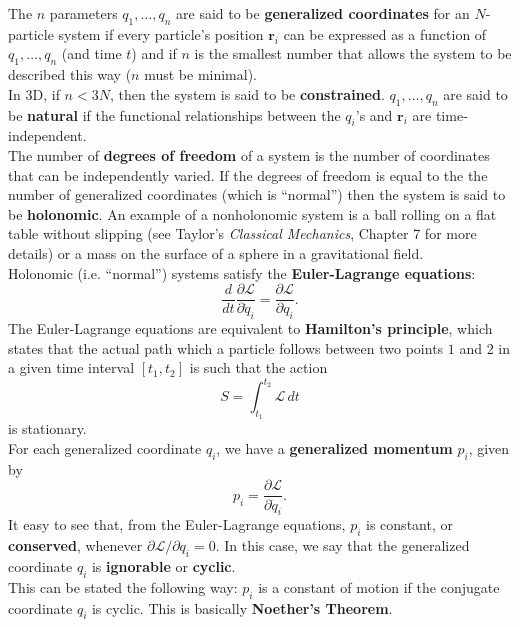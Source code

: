 \documentclass{book}
\theoremstyle{definition}
\newcommand{\p}{\partial}
\newcommand{\lag}{\mathcal{L}}
\newcommand{\f}[2]{\frac{#1}{#2}}
\begin{document}
The $n$ parameters $q_1,\dots,q_n$ are said to be \textbf{generalized coordinates} for an $N$-particle system if every particle's position $\mathbf{r}_i$ can be expressed as a function of $q_1,\dots,q_n$ (and time $t$) and if $n$  is the smallest number that allows the system to be described this way ($n$ must be minimal). \\

In 3D, if $n< 3N$, then the system is said to be \textbf{constrained}. $q_1,\dots,q_n$ are said to be \textbf{natural} if the functional relationships between the $q_i$'s and $\mathbf{r}_i$ are time-independent. \\


The number of \textbf{degrees of freedom} of a system is the number of coordinates that can be independently varied. If the degrees of freedom is equal to the the number of generalized coordinates (which is ``normal'') then the system is said to be \textbf{holonomic}. An example of a nonholonomic system is a ball rolling on a flat table without slipping (see Taylor's \textit{Classical Mechanics}, Chapter 7 for more details) or a mass on the surface of a sphere in a gravitational field. \\


Holonomic (i.e. ``normal'') systems satisfy the \textbf{Euler-Lagrange equations}:
\begin{equation*}
\f{d}{dt}\f{\p \lag}{\p \dot{q}_i} = \f{\p \lag}{\p {q}_i}.
\end{equation*} 
The Euler-Lagrange equations are equivalent to \textbf{Hamilton's principle}, which states that the actual path which a particle follows between two points $1$ and $2$ in a given time interval $[t_1,t_2]$ is such that the action 
\begin{equation*}
S = \int^{t_2}_{t_1} \lag\,dt
\end{equation*}
is stationary. \\


For each generalized coordinate $q_i$, we have a \textbf{generalized momentum} $p_i$, given by
\begin{equation*}
p_i = \f{\p \lag}{\p \dot{q}_i}.
\end{equation*}
It easy to see that, from the Euler-Lagrange equations, $p_i$ is constant, or \textbf{conserved}, whenever $\p\lag / \p q_i = 0$. In this case, we say that the generalized coordinate $q_i$ is \textbf{ignorable} or \textbf{cyclic}.  \\

This can be stated the following way: $p_i$ is a constant of motion if the conjugate coordinate $q_i$ is cyclic. This is basically \textbf{Noether's Theorem}. 
\end{document}

